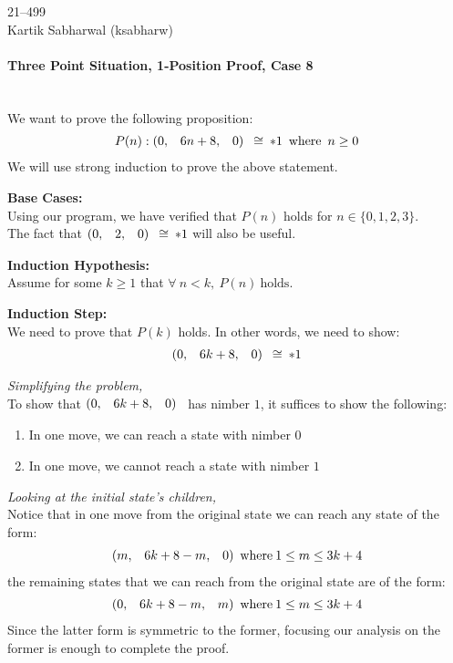 \documentclass{article}
\makeatletter
\newcommand{\game}[3]{\begin{array}{@{}*6r}(#1, & #2, & #3)\end{array}}
\newcommand{\gcong}{\cong\:}
\makeatother
\begin{document}
\begin{center}
  21--499 \\
  Kartik Sabharwal (ksabharw)
\end{center}
\paragraph{Three Point Situation, 1-Position Proof, Case 8}\mbox{}\\
We want to prove the following proposition:
\begin{equation*}
  P(n) : \game{0}{6n + 8}{0} \gcong *1 \enspace \text{where} \enspace n \geq 0
\end{equation*}
We will use strong induction to prove the above statement.

\bigskip
\textbf{Base Cases:} \\
Using our program, we have verified that $P(n)$ holds for
$n \in \{0, 1, 2, 3\}$. \\
The fact that $\game{0}{2}{0} \gcong *1$ will also be useful.

\bigskip
\textbf{Induction Hypothesis:} \\
Assume for some $k \geq 1$ that 
$\forall \: n < k, \: P(n) \: \text{holds}$.

\bigskip
\textbf{Induction Step:} \\
We need to prove that $P(k)$ holds. In other words, we need to show:
\begin{equation*}
  \game{0}{6k + 8}{0} \gcong *1
\end{equation*}

\bigskip
\textit{Simplifying the problem,}\\
To show that $\game{0}{6k+8}{0}$ has nimber $1$, it suffices to show
the following:
\begin{enumerate}
  \item In one move, we can reach a state with nimber $0$
  \item In one move, we cannot reach a state with nimber $1$
\end{enumerate}

\bigskip
\textit{Looking at the initial state's children,}\\
Notice that in one move from the original state we can reach any state
of the form:
\begin{equation*}
  \game{m}{6k+8-m}{0} \text{where} \: 1 \leq m \leq 3k + 4 
  \end{equation*}
the remaining states that we can reach from the original state are of
the form:
\begin{equation*}
  \game{0}{6k+8-m}{m} \text{where} \: 1 \leq m \leq 3k + 4
\end{equation*}
Since the latter form is symmetric to the former, focusing our analysis
on the former is enough to complete the proof.
\end{document}
